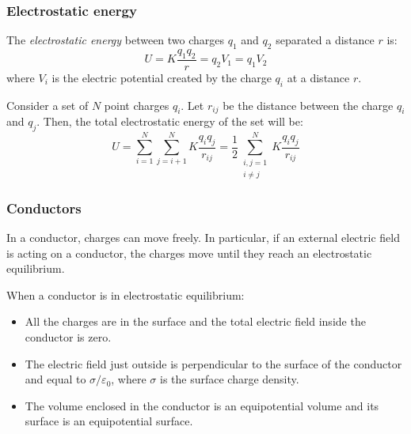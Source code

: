 \documentclass[../../../main.tex]{subfiles}
\begin{document}
\begin{multicols}{2}
  \subsubsection{Electrostatic energy}
  \begin{definition}
    The \emph{electrostatic energy} between two charges $q_1$ and $q_2$ separated a distance $r$ is: $$U=K\frac{q_1q_2}{r}=q_2V_1=q_1V_2$$
    where $V_i$ is the electric potential created by the charge $q_i$ at a distance $r$.
  \end{definition}
  \begin{prop}
    Consider a set of $N$ point charges $q_i$. Let $r_{ij}$ be the distance between the charge $q_i$ and $q_j$. Then, the total electrostatic energy of the set will be: $$U=\sum_{i=1}^N\sum_{j=i+1}^NK\frac{q_iq_j}{r_{ij}}=\frac{1}{2}\sum_{\substack{i,j=1\\i\ne j}}^NK\frac{q_iq_j}{r_{ij}}$$
  \end{prop}
  \subsubsection{Conductors}
  \begin{prop}
    In a conductor, charges can move freely. In particular, if an external electric field is acting on a conductor, the charges move until they reach an electrostatic equilibrium.
  \end{prop}
  \begin{prop}
    When a conductor is in electrostatic equilibrium:
    \begin{itemize}
      \item All the charges are in the surface and the total electric field inside the conductor is zero.
      \item The electric field just outside is perpendicular to the surface of the conductor and equal to $\sigma/\varepsilon_0$, where $\sigma$ is the surface charge density.
      \item The volume enclosed in the conductor is an equipotential volume and its surface is an equipotential surface.
    \end{itemize}
  \end{prop}

\end{multicols}
\end{document}
